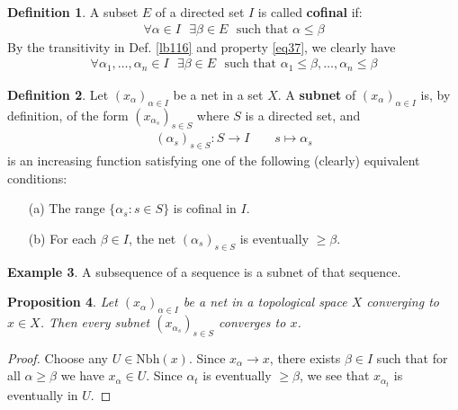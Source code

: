 \documentclass[12pt,b5paper,notitlepage]{article}
\theoremstyle{definition}
\newtheorem{df}{Definition}[section]
\newtheorem{eg}[df]{Example}
\theoremstyle{plain}
\newtheorem{pp}[df]{Proposition}
\newcommand{\Nbh}{\mathrm{Nbh}}
\numberwithin{equation}{section}
\begin{document}
\begin{df}
A subset $E$ of a directed set $I$ is called \textbf{cofinal}  if:
\begin{align*}
\forall\alpha\in I~~~\exists\beta\in E~~~\text{such that }\alpha\leq\beta
\end{align*}
By the transitivity in Def. \ref{lb116} and property \eqref{eq37}, we clearly have
\begin{align*}
\forall\alpha_1,\dots,\alpha_n\in I~~~\exists\beta\in E~~~\text{such that }\alpha_1\leq\beta,\dots,\alpha_n\leq\beta
\end{align*}
\end{df}



\begin{df}
Let $(x_\alpha)_{\alpha\in I}$ be a net in a set $X$. A \textbf{subnet}  of $(x_\alpha)_{\alpha\in I}$ is, by definition, of the form $(x_{\alpha_s})_{s\in S}$ where $S$ is a directed set, and
\begin{align*}
(\alpha_s)_{s\in S}:S\rightarrow I\qquad s\mapsto \alpha_s
\end{align*}
is an increasing function satisfying one of the following (clearly) equivalent conditions:
\begin{enumerate}
\item[(a)] The range $\{\alpha_s:s\in S\}$ is cofinal in $I$.
\item[(b)] For each $\beta\in I$, the net $(\alpha_s)_{s\in S}$ is eventually $\geq\beta$.
\end{enumerate}
\end{df}


\begin{eg}
A subsequence of a sequence is a subnet of that sequence.
\end{eg}


\begin{pp}
Let $(x_\alpha)_{\alpha\in I}$ be a net in a topological space $X$ converging to $x\in X$. Then every subnet $(x_{\alpha_s})_{s\in S}$ converges to $x$.
\end{pp}

\begin{proof}
Choose any $U\in\Nbh(x)$. Since $x_\alpha\rightarrow x$, there exists $\beta\in I$ such that for all $\alpha\geq\beta$ we have $x_\alpha\in U$. Since $\alpha_t$ is eventually $\geq\beta$, we see that $x_{\alpha_t}$ is eventually in $U$.
\end{proof}
\end{document}
